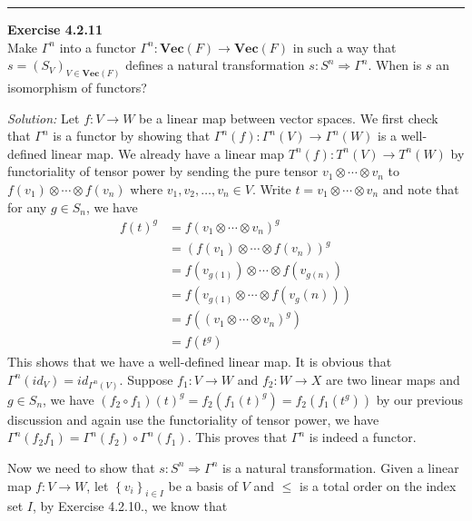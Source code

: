 \documentclass[a4paper, 12pt]{article}
\newenvironment{problem}[2][Exercise]
    { \begin{mdframed}[backgroundcolor=gray!20] \textbf{#1 #2} \\}
    {  \end{mdframed}}
\newenvironment{solution}
    {\textit{Solution:}}
    {}
\begin{document}
\noindent\rule{7in}{2.8pt}
\begin{problem}{4.2.11}
Make \(\Gamma^n\) into a functor \(\Gamma^n:\mathbf{Vec}(F)\rightarrow \mathbf{Vec}(F)\) in such a way that \(s=(S_V)_{V\in \mathbf{Vec}(F)}\) defines a natural transformation 
\(s:S^n\Rightarrow \Gamma^n\). When is \(s\) an isomorphism of functors? 
\end{problem}
\begin{solution}
Let \(f:V\rightarrow W\) be a linear map between vector spaces. We first check that \(\Gamma^n\) is a functor by showing that \(\Gamma^n(f):\Gamma^n(V)\rightarrow \Gamma^n(W)\) is a well-defined linear map. We already have a linear map 
\(T^n(f):T^n(V)\rightarrow T^n(W)\) by functoriality of tensor power by sending the pure tensor \(v_1\otimes \cdots \otimes v_n\) to \(f(v_1)\otimes \cdots\otimes f(v_n)\) where \(v_1,v_2,\ldots,v_n\in V\). Write \(t=v_1\otimes \cdots\otimes v_n\) and note that 
for any \(g\in S_n\), we have 
\begin{align*}
	f(t)^g&=f(v_1\otimes \cdots\otimes v_n)^g\\ 
	      &=(f(v_1)\otimes \cdots\otimes f(v_n))^g\\ 
		  &=f(v_{g(1)})\otimes \cdots\otimes f(v_{g(n)})\\ 
		  &=f(v_{g(1)}\otimes \cdots\otimes f(v_g(n)))\\ 
		  &=f((v_1\otimes \cdots\otimes v_n)^g)\\ 
		  &=f(t^g)
\end{align*}
This shows that we have a well-defined linear map. It is obvious that \(\Gamma^n(id_V)=id_{\Gamma^n(V)}\). Suppose \(f_1:V\rightarrow W\) and \(f_2:W\rightarrow X\) are two linear maps and \(g\in S_n\), we have 
\((f_2\circ f_1)(t)^g=f_2(f_1(t)^g)=f_2(f_1(t^g))\) by our previous discussion and again use the functoriality of tensor power, we have \(\Gamma^n(f_2f_1)=\Gamma^n(f_2)\circ \Gamma^n(f_1)\). This proves that \(\Gamma^n\) is indeed a functor. 
\par 
Now we need to show that \(s:S^n\Rightarrow \Gamma^n\) is a natural transformation. Given a linear map \(f:V\rightarrow W\), let \(\left\{ v_i \right\}_{i\in I}\) be a basis of \(V\) and \(\leq\) is a total order on the index set \(I\), by Exercise 4.2.10., we know that 

\end{solution}
\end{document}
